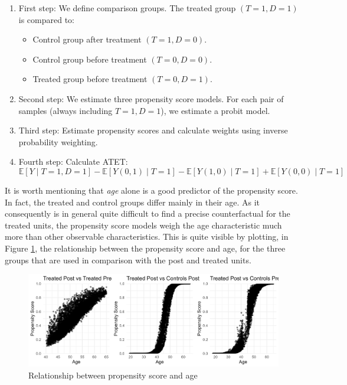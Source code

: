 \documentclass{scrartcl}
\begin{document}
\begin{enumerate}
    \item First step: We define comparison groups. The treated group $(T=1,D=1)$ is compared to:
    \begin{itemize}
        \item Control group after treatment $(T=1,D=0)$.
        \item Control group before treatment $(T=0,D=0)$.
        \item Treated group before treatment $(T=0,D=1)$.
    \end{itemize}
    \item Second step: We estimate three propensity score models. For each pair of samples (always including $T=1,D=1$), we estimate a probit model.
    \item Third step: Estimate propensity scores and calculate weights using inverse probability weighting.
    \item Fourth step: Calculate ATET: \[
\mathbb{E}[Y \mid T=1, D=1] 
- \mathbb{E}[Y(0,1) \mid T=1] 
- \mathbb{E}[Y(1,0) \mid T=1] 
+ \mathbb{E}[Y(0,0) \mid T=1]
\]
\end{enumerate}



It is worth mentioning that \textit{age} alone is a good predictor of the propensity score. In fact, the treated and control groups differ mainly in their age. As it consequently is in general quite difficult to find a precise counterfactual for the treated units, the propensity score models weigh the age characteristic much more than other observable characteristics. This is quite visible by plotting, in Figure \ref{fig:prop_scores}, the relationship between the propensity score and age, for the three groups that are used in comparison with the post and treated units. 

\begin{figure}
    \centering
    \includegraphics[width=0.8\linewidth]{output/figures/final_propensity_scores.jpg}
    \caption{Relationship between propensity score and age}
    \label{fig:prop_scores}
\end{figure}
\end{document}
